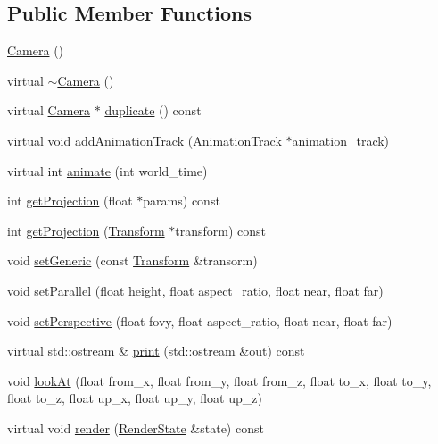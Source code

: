 \subsection*{Public Member Functions}
\begin{CompactItemize}
\item 
\hyperlink{classm3g_1_1Camera_a3f3efcb2fcc75de885df29041103cd2}{Camera} ()
\item 
virtual \hyperlink{classm3g_1_1Camera_b921e886e6f14e117eb8099ccb0a3775}{$\sim$Camera} ()
\item 
virtual \hyperlink{classm3g_1_1Camera}{Camera} $\ast$ \hyperlink{classm3g_1_1Camera_6279f7f8ab52af683fadd193d7694f2d}{duplicate} () const 
\item 
virtual void \hyperlink{classm3g_1_1Camera_415c0b110f95410ded9b85e5d99a496b}{addAnimationTrack} (\hyperlink{classm3g_1_1AnimationTrack}{AnimationTrack} $\ast$animation\_\-track)
\item 
virtual int \hyperlink{classm3g_1_1Camera_8aad1ceab4c2a03609c8a42324ce484d}{animate} (int world\_\-time)
\item 
int \hyperlink{classm3g_1_1Camera_a2ebe46a4e16fee86d4f547588411302}{getProjection} (float $\ast$params) const 
\item 
int \hyperlink{classm3g_1_1Camera_9e0c204df146342990703acb744954b1}{getProjection} (\hyperlink{classm3g_1_1Transform}{Transform} $\ast$transform) const 
\item 
void \hyperlink{classm3g_1_1Camera_51c42821097e90d3f59e87676684f60a}{setGeneric} (const \hyperlink{classm3g_1_1Transform}{Transform} \&transorm)
\item 
void \hyperlink{classm3g_1_1Camera_cb4535fd75b28b4d58390962d0c0e588}{setParallel} (float height, float aspect\_\-ratio, float near, float far)
\item 
void \hyperlink{classm3g_1_1Camera_ca92a48ebe3424deac8e54c27550189d}{setPerspective} (float fovy, float aspect\_\-ratio, float near, float far)
\item 
virtual std::ostream \& \hyperlink{classm3g_1_1Camera_6fea17fa1532df3794f8cb39cb4f911f}{print} (std::ostream \&out) const 
\item 
void \hyperlink{classm3g_1_1Camera_0006b18ae0e27a031d533e987b9756a8}{lookAt} (float from\_\-x, float from\_\-y, float from\_\-z, float to\_\-x, float to\_\-y, float to\_\-z, float up\_\-x, float up\_\-y, float up\_\-z)
\item 
virtual void \hyperlink{classm3g_1_1Camera_8babc8a79b78615da51161e94029eea9}{render} (\hyperlink{structm3g_1_1RenderState}{RenderState} \&state) const 
\end{CompactItemize}
